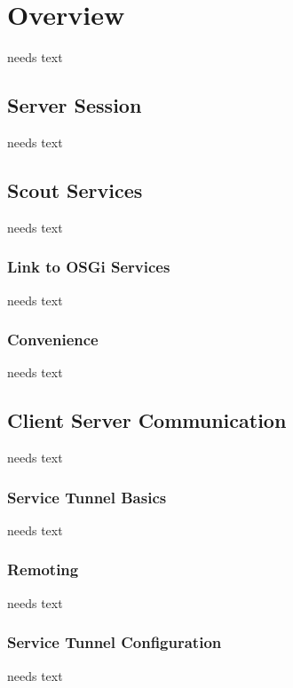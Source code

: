 \documentclass[a4paper,10pt,twoside]{book}
\begin{document}
  \sloppy
\fi


\chapter{Overview}
needs text
  
\section{Server Session}
needs text

\section{Scout Services}
needs text

\subsection{Link to OSGi Services}
needs text

\subsection{Convenience}
needs text
  
\section{Client Server Communication}
needs text

\subsection{Service Tunnel Basics}
needs text

\subsection{Remoting}
needs text
  
\subsection{Service Tunnel Configuration}
needs text
  

\end{document}
